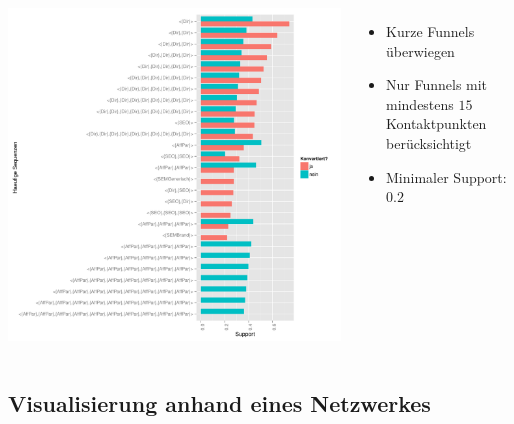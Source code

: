 \begin{frame}
	\begin{columns}
		\column{7cm}
			\includegraphics[scale=0.3]{spm_min15.pdf}
		\column{4cm}
			\begin{itemize}
				\item Kurze Funnels überwiegen
				\item Nur Funnels mit mindestens $15$ Kontaktpunkten berücksichtigt
				\item Minimaler Support: $0.2$
			\end{itemize}
	\end{columns}
\end{frame}

\subsection{Visualisierung anhand eines Netzwerkes}

